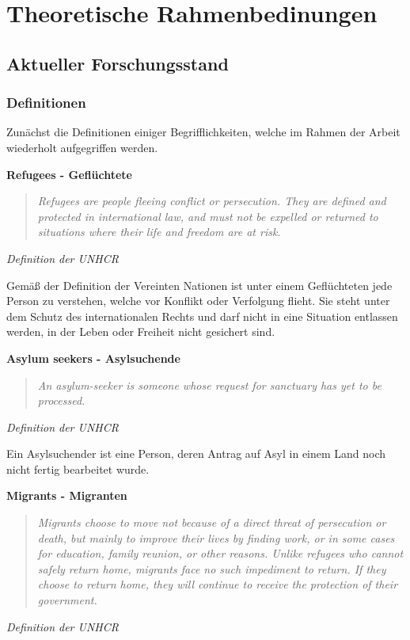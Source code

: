 \section{Theoretische Rahmenbedinungen}

\subsection{Aktueller Forschungsstand}

\subsubsection{Definitionen}

Zunächst die Definitionen einiger Begrifflichkeiten, welche im Rahmen der Arbeit wiederholt aufgegriffen werden.\newline

\textbf{Refugees - Geflüchtete}

\begin{quote}
    \textit{Refugees are people fleeing conflict or persecution. They are defined and protected in international law, and must not be expelled or returned to situations where their life and freedom are at risk.}\cite{unhcr2017refugees}
\end{quote}
\centerline{\textit{Definition der UNHCR}}

Gemäß der Definition der Vereinten Nationen ist unter einem Geflüchteten jede Person zu verstehen, welche vor Konflikt oder Verfolgung flieht. Sie steht unter dem Schutz des internationalen Rechts und darf nicht in eine Situation entlassen werden, in der Leben oder Freiheit nicht gesichert sind.\newline


\textbf{Asylum seekers - Asylsuchende}

\begin{quote}
    \textit{An asylum-seeker is someone whose request for sanctuary has yet to be processed.}\cite{unhcr2015asylum}
\end{quote}
\centerline{\textit{Definition der UNHCR}}


Ein Asylsuchender ist eine Person, deren Antrag auf Asyl in einem Land noch nicht fertig bearbeitet wurde.

\textbf{Migrants - Migranten}

\begin{quote}
    \textit{Migrants choose to move not because of a direct threat of persecution or death, but mainly to improve their lives by finding work, or in some cases for education, family reunion, or other reasons. Unlike refugees who cannot safely return home, migrants face no such impediment to return. If they choose to return home, they will continue to receive the protection of their government.}\cite{unhcr2016migrant}
\end{quote}
\centerline{\textit{Definition der UNHCR}}

